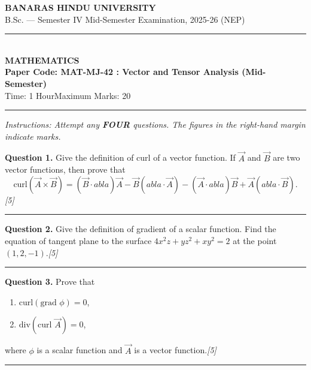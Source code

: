 \documentclass[11pt,a4paper]{article}
\newcommand{\pts}[1]{\hfill   \textit{[#1]}}
\begin{document}
\begin{center}
  {\large\bfseries BANARAS HINDU UNIVERSITY}\\[2pt]
  {\normalsize B.Sc. --- Semester IV Mid-Semester Examination, 2025-26 (NEP)}\\[6pt]
  \rule{0.8\linewidth}{0.5pt}\\[6pt]
  {\large\bfseries MATHEMATICS}\\[4pt]
  {\large\bfseries Paper Code: MAT-MJ-42 : Vector and Tensor Analysis (Mid-Semester)}\\[4pt]
  {\normalsize Time: 1 Hour\hfill Maximum Marks: 20}
\end{center}

\rule{\linewidth}{0.4pt}

\smallskip



\noindent   \textit{Instructions: Attempt any   \textbf{FOUR} questions. The figures in the right-hand margin indicate marks.}

\bigskip




\noindent   \textbf{Question 1.} Give the definition of curl of a vector function. If $\vec{A}$ and $\vec{B}$ are two vector functions, then prove that
\[
   \text{curl}(\vec{A}  \times \vec{B}) = (\vec{B} \cdot 
abla)\vec{A} - \vec{B}(
abla \cdot \vec{A}) - (\vec{A} \cdot 
abla)\vec{B} + \vec{A}(
abla \cdot \vec{B}).
\]\pts{5}

\medskip\rule{\linewidth}{0.2pt}\medskip




\noindent   \textbf{Question 2.} Give the definition of gradient of a scalar function. Find the equation of tangent plane to the surface $4x^2 z + yz^2 + xy^2 = 2$ at the point $(1, 2, -1)$.\pts{5}

\medskip\rule{\linewidth}{0.2pt}\medskip




\noindent   \textbf{Question 3.} Prove that

\begin{enumerate}[label=(\roman*)]
  \item $ \text{curl}( \text{grad }\phi) = 0$,
  \item $ \text{div}( \text{curl }\vec{A}) = 0$,
\end{enumerate}
where $\phi$ is a scalar function and $\vec{A}$ is a vector function.\pts{5}

\medskip\rule{\linewidth}{0.2pt}\medskip
\end{document}

